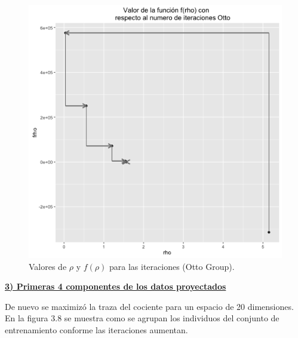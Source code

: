 \begin{figure}[!ht]
  \centering
  \includegraphics[width=.75 \textwidth]{Figures/Chapter4_Iteraciones_Otto.png} 
  \caption{Valores de $\rho$ y $f(\rho)$ para las iteraciones (Otto Group).}
\end{figure}

\pagebreak

\underline{\textbf{3) Primeras 4 componentes de los datos proyectados}}

De nuevo se maximizó la traza del cociente para un espacio de 20 dimensiones. En la figura 3.8 se muestra como se agrupan los individuos del conjunto de entrenamiento conforme las iteraciones aumentan.

